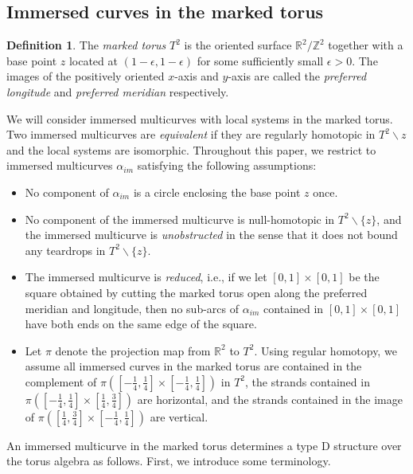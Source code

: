 \documentclass{amsart}
\theoremstyle{definition}
\newtheorem{defn}[thm]{Definition}
\theoremstyle{remark}
\numberwithin{equation}{section}
\numberwithin{equation}{section} \makeatletter
\begin{document}
\subsection{Immersed curves in the marked torus}\label{Subsection, marked torus and immersed curves}
\begin{defn}
The \emph{marked torus} $T^2$ is the oriented surface $\mathbb{R}^2/\mathbb{Z}^2$ together with a base point $z$ located at $(1-\epsilon,1-\epsilon)$ for some sufficiently small $\epsilon>0$. The images of the positively oriented $x$-axis and $y$-axis are called the \emph{preferred longitude} and \emph{preferred meridian} respectively.  
\end{defn}
We will consider immersed multicurves with local systems in the marked torus. Two immersed multicurves are \textit{equivalent} if they are regularly homotopic in $T^2\backslash{z}$ and the local systems are isomorphic. Throughout this paper, we restrict to immersed multicurves $\alpha_{im}$ satisfying the following assumptions: 
\begin{itemize}
	\item[(C-1)]No component of $\alpha_{im}$ is a circle enclosing the base point $z$ once.
	\item[(C-2)]No component of the immersed multicurve is null-homotopic in $T^2\backslash\{z\}$, and the immersed multicurve is \emph{unobstructed} in the sense that it does not bound any teardrops in $T^2\backslash\{z\}$.
	\item[(C-3)]The immersed multicurve is \emph{reduced}, i.e., if we let $[0,1]\times[0,1]$ be the square obtained by cutting the marked torus open along the preferred meridian and longitude, then no sub-arcs of $\alpha_{im}$ contained in $[0,1]\times[0,1]$ have both ends on the same edge of the square.  
	\item[(C-4)]Let $\pi$ denote the projection map from $\mathbb{R}^2$ to $T^2$. Using regular homotopy, we assume all immersed curves in the marked torus are contained in the complement of $\pi([-\frac{1}{4},\frac{1}{4}]\times [-\frac{1}{4},\frac{1}{4}])$ in $T^2$, the strands contained in $\pi([-\frac{1}{4},\frac{1}{4}]\times [\frac{1}{4},\frac{3}{4}])$ are horizontal, and the strands contained in the image of $\pi([\frac{1}{4},\frac{3}{4}]\times [-\frac{1}{4},\frac{1}{4}])$ are vertical.
\end{itemize} 
An immersed multicurve in the marked torus determines a type D structure over the torus algebra as follows. First, we introduce some terminology.
\end{document}
